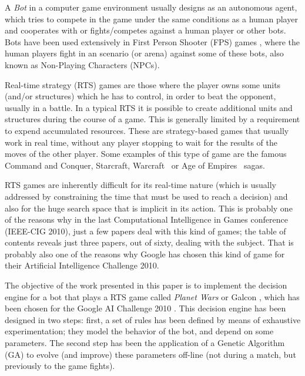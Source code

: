 \documentclass{llncs}
\begin{document}
A \textit{Bot} in a computer game environment usually designs as an
autonomous agent, which tries to compete in the game under the same
conditions as a human player and
cooperates with or fights/competes against a human player or other
bots. Bots have been used extensively in First Person Shooter (FPS)
games
\cite{laird2001using,ControllingBot_CEC2010,cooperativebots_CIG2010,Agent_Smith_CEC2009},
where the human players fight in an scenario (or arena) against some
of these bots, also known as Non-Playing Characters (NPCs). 

Real-time strategy (RTS) games are those where the player owns some
units (and/or structures) which he has to control, in order to beat
the opponent, usually in a battle. In a typical RTS it is possible to
create additional units and structures during the course of a
game. This is generally limited by a requirement to expend accumulated
resources. These are strategy-based games that usually work in real
time, without any player stopping to wait for the results of the moves
of the other player. Some examples of this type of game are the
famous Command and Conquer\texttrademark, Starcraft\texttrademark,
Warcraft\texttrademark~ or Age of Empires\texttrademark~ sagas.  



RTS games are inherently difficult for its real-time nature (which is
usually addressed by constraining the time that must be used to reach
a decision) and also for the huge search space that is implicit in its
action. This is probably one of the reasons why in the last
Computational Intelligence in Games conference (IEEE-CIG 2010), just a
few papers deal with this kind of games; the table of contents reveals
just three papers, out of sixty, dealing with the subject. That is
probably also one of the reasons why Google has chosen this kind of
game for their Artificial Intelligence Challenge 2010.

The objective of the work presented in this paper is to implement the
decision engine for a bot that plays a RTS game called
\textit{Planet Wars} or Galcon \cite{wiki:galcon}, which has been chosen for the Google AI
Challenge 2010 \cite{webGAIC}. This decision engine has been designed
in two steps: first, a set of rules has been defined by means of
exhaustive experimentation; they model the behavior of the bot, and depend on some parameters. 
The second step has been the application of a Genetic Algorithm (GA) \cite{GAs_Michalewicz96} 
to evolve (and improve) these parameters off-line (not during a match, but previously to the game fights). 
\end{document}
